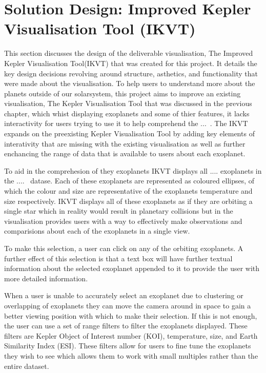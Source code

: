 \chapter{Solution Design: Improved Kepler Visualisation Tool (IKVT)}\label{C:sd}

This section discusses the design of the deliverable visualisation, The Improved Kepler Visualisation Tool(IKVT) that was created for this project. It details the key design decisions revolving around structure, asthetics, and functionality that were made about the visualisation. 
To help users to understand more about the planets outside of our solarsystem, this project aims to improve an existing visualisation, The Kepler Visualisation Tool that was discussed in the previous chapter, which whist displaying exoplanets and some of thier features, it lacks interactivity for users trying to use it to help comprehend the ...~. The IKVT expands on the preexisting Kepler Visualisation Tool by adding key elements of interativity that are missing with the existing visualisation as well as further enchancing the range of data that is available to users about each exoplanet.

To aid in the comprehesion of they exoplanets IKVT displays all .... exoplanets in the ....~ datase. Each of these exoplanets are represented as coloured ellipses, of which the colour and size are representative of the exoplanets temperature and size respectively. IKVT displays all of these exoplanets as if they are orbiting a single star which in reality would result in planetary collisions but in the visualisation provides users with a way to effectively make observations and comparisions about each of the exoplanets in a single view. 

To make this selection, a user can click on any of the orbiting exoplanets.  A further effect of this selection is that a text box will have further textual information about the selected exoplanet appended to it to provide the user with more detailed information.

When a user is unable to accurately select an exoplanet due to clustering or overlapping of exoplanets they can move the camera around in space to gain a better viewing position with which to make their selection. If this is not enough, the user can use a set of range filters to filter the exoplanets displayed. These filters are Kepler Object of Interest number (KOI), temperature, size, and Earth Similarity Index (ESI). These filters allow for users to fine tune the exoplanets they wish to see which allows them to work with small multiples rather than the entire dataset.

